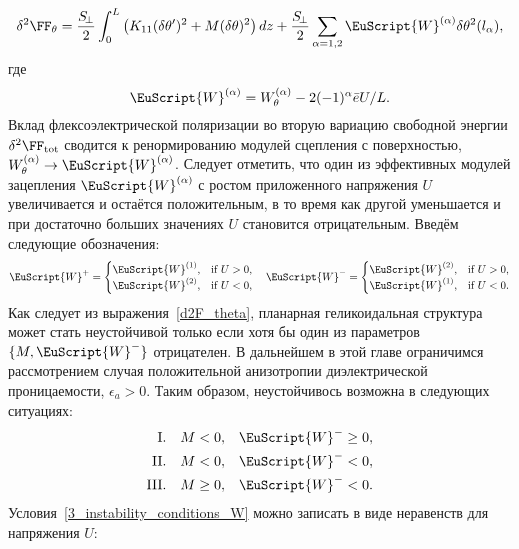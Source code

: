 \begin{equation}\label{d2F_theta}
\delta^2 \FF_\theta =
\frac{S_{\!\bot}}{2}\int_{0}^{L}\left(K_{11}(\delta\theta')^2 + M(\delta\theta)^2\right) dz + \frac{S_{\!\bot}}{2}\sum_{\alpha=1,2}
\EuScript{W}^{(\alpha)}
\delta\theta^2(l_\alpha),
\end{equation}
где
\begin{equation}\label{W_renorm}
\EuScript{W}^{(\alpha)}=W_\theta^{(\alpha)} - 2(-1)^\alpha\bar{e} U/L.
\end{equation}
Вклад флексоэлектрической поляризации во вторую вариацию свободной энергии $\delta^2\FF_\text{tot}$ сводится к ренормированию модулей сцепления с поверхностью, $W_\theta^{(\alpha)}\rightarrow \EuScript{W}^{(\alpha)}$.
Следует отметить, что один из эффективных модулей зацепления $\EuScript{W}^{(\alpha)}$ с ростом приложенного напряжения $U$ увеличивается и остаётся положительным, в то время как другой уменьшается и при достаточно больших значениях $U$ становится отрицательным.
Введём следующие обозначения:
\begin{equation}\label{Wtheta_eff_pm}
\EuScript{W}^{+} =
\begin{cases}
\EuScript{W}^{(1)},&\mbox{if } U >0,\\
\EuScript{W}^{(2)},& \mbox{if } U<0,
\end{cases}\quad
\EuScript{W}^{-} =
\begin{cases}
\EuScript{W}^{(2)},& \mbox{if } U >0,\\
\EuScript{W}^{(1)},& \mbox{if } U<0.
\end{cases}
\end{equation}
Как следует из выражения~\eqref{d2F_theta}, планарная геликоидальная структура может стать неустойчивой только если хотя бы один из параметров $\{M, \EuScript{W}^{-}\}$ отрицателен.
В дальнейшем в этой главе ограничимся рассмотрением случая положительной анизотропии диэлектрической проницаемости, $\epsilon_a > 0$.
Таким образом, неустойчивось возможна в следующих ситуациях:
\begin{equation}\label{3_instability_conditions_W}
\begin{aligned}
\centering
\mathrm{I}. &&M < 0,\quad & \EuScript{W}^{-} \geq  0,\\
\mathrm{II}. && M < 0,\quad &\EuScript{W}^{-} < 0,\\
\mathrm{III}. && M \geq 0,\quad &\EuScript{W}^{-} < 0.\\
\end{aligned}
\end{equation}
Условия~\eqref{3_instability_conditions_W} можно записать в виде неравенств для напряжения $U$:

